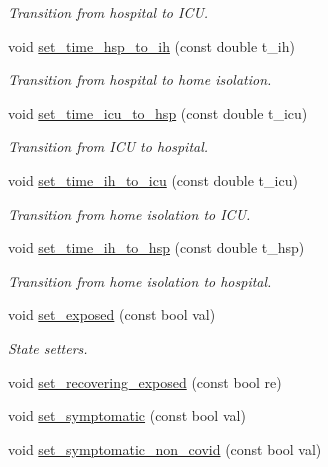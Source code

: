 \begin{DoxyCompactItemize}
\begin{DoxyCompactList}\small\item\em Transition from hospital to I\+CU. \end{DoxyCompactList}\item 
void \hyperlink{classAgent_ab0459e0e04f77529740f38d4fc727adb}{set\+\_\+time\+\_\+hsp\+\_\+to\+\_\+ih} (const double t\+\_\+ih)
\begin{DoxyCompactList}\small\item\em Transition from hospital to home isolation. \end{DoxyCompactList}\item 
void \hyperlink{classAgent_ada17009b6af62ef4f47322ebb4359182}{set\+\_\+time\+\_\+icu\+\_\+to\+\_\+hsp} (const double t\+\_\+icu)
\begin{DoxyCompactList}\small\item\em Transition from I\+CU to hospital. \end{DoxyCompactList}\item 
void \hyperlink{classAgent_a3f52852fe867096f13ec980a67a62d16}{set\+\_\+time\+\_\+ih\+\_\+to\+\_\+icu} (const double t\+\_\+icu)
\begin{DoxyCompactList}\small\item\em Transition from home isolation to I\+CU. \end{DoxyCompactList}\item 
void \hyperlink{classAgent_a5967e9f87613fa235e22b5212d645960}{set\+\_\+time\+\_\+ih\+\_\+to\+\_\+hsp} (const double t\+\_\+hsp)
\begin{DoxyCompactList}\small\item\em Transition from home isolation to hospital. \end{DoxyCompactList}\item 
void \hyperlink{classAgent_a33c15434f6aa6e70eaf80044caa16376}{set\+\_\+exposed} (const bool val)
\begin{DoxyCompactList}\small\item\em State setters. \end{DoxyCompactList}\item 
void \hyperlink{classAgent_a8a0e23235990818d82c04485cb48b97d}{set\+\_\+recovering\+\_\+exposed} (const bool re)
\item 
void \hyperlink{classAgent_a4fe846deec4401a76f437c9b3276b9a2}{set\+\_\+symptomatic} (const bool val)
\item 
void \hyperlink{classAgent_a5d8cc1ff3240d83154cb0ec3ea1c65a1}{set\+\_\+symptomatic\+\_\+non\+\_\+covid} (const bool val)

\end{DoxyCompactItemize}
